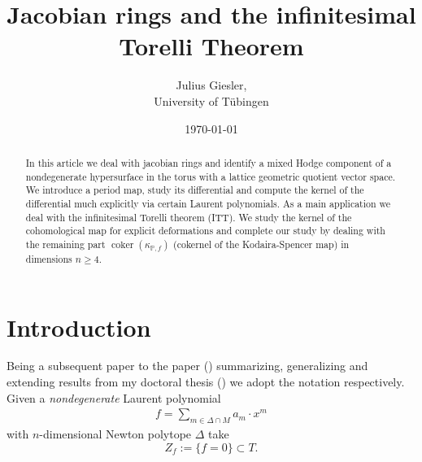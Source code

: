 \documentclass[12pt, english]{article}
\DeclareMathOperator{\coker}{coker}
\begin{document}
	\title{Jacobian rings and the infinitesimal Torelli Theorem}
\author{Julius Giesler,\\ University of T\"ubingen}
\date{\today}
\maketitle
\begin{abstract}
	In this article we deal with jacobian rings and identify a mixed Hodge component of a nondegenerate hypersurface in the torus with a lattice geometric quotient vector space. We introduce a period map, study its differential and compute the kernel of the differential much explicitly via certain Laurent polynomials. As a main application we deal with the infinitesimal Torelli theorem (ITT). We study the kernel of the cohomological map for explicit deformations and complete our study by dealing with the remaining part $\coker(\kappa_{\mathbb{P},f})$ (cokernel of the Kodaira-Spencer map) in dimensions $n \geq 4$.
\end{abstract}

\section{Introduction}

Being a subsequent paper to the paper (\cite{Gie22}) summarizing, generalizing and extending results from my doctoral thesis (\cite{Gie23}) we adopt the notation respectively. Given a \textit{nondegenerate} Laurent polynomial 
\begin{align} \label{represenation_f_intro}
	f = \sum\limits_{m \in \Delta \cap M} a_m \cdot x^m
\end{align}
with $n$-dimensional Newton polytope $\Delta$ take 
\[ Z_f := \{ f=0 \} \subset T. \]
\end{document}

